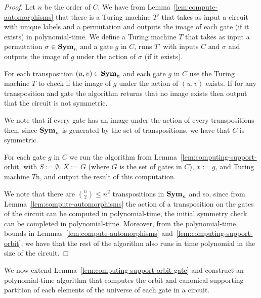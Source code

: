 \documentclass[../paper.tex]{subfiles}
\begin{document}
\begin{proof}
  Let $n$ be the order of $C$. We have from
  Lemma~\ref{lem:compute-automorphisms} that there is a Turing machine $T'$ that
  takes as input a circuit with unique labels and a permutation and outputs the
  image of each gate (if it exists) in polynomial-time. We define a Turing
  machine $T$ that takes as input a permutation $\sigma \in \text{\textbf{Sym}}_n$ and a gate
  $g$ in $C$, runs $T'$ with inputs $C$ and $\sigma$ and outputs the image of
  $g$ under the action of $\sigma$ (if it exists).

  For each transposition $(u,v) \in \text{\textbf{Sym}}_n$ and each gate $g$ in $C$ use the
  Turing machine $T$ to check if the image of $g$ under the action of $(u,v)$
  exists. If for any transposition and gate the algorithm returns that no image
  exists then output that the circuit is not symmetric.

  We note that if every gate has an image under the action of every
  transpositions then, since $\text{\textbf{Sym}}_n$ is generated by the set of transpositions,
  we have that $C$ is symmetric.

  For each gate $g$ in $C$ we run the algorithm from
  Lemma~\ref{lem:computing-support-orbit} with $S := \emptyset$, $X := G$ (where
  $G$ is the set of gates in $C$), $x := g$, and Turing machine $T$n, and output
  the result of this computation.
  
  We note that there are ${{n}\choose{2}} \leq n^2$ transpositions in $\text{\textbf{Sym}}_n$
  and so, since from Lemma~\ref{lem:compute-automorphisms} the action of a
  transposition on the gates of the circuit can be computed in polynomial-time,
  the initial symmetry check can be completed in polynomial-time. Moreover, from
  the polynomial-time bounds in Lemmas~\ref{lem:compute-automorphisms}
  and~\ref{lem:computing-support-orbit}, we have that the rest of the algorithm
  also runs in time polynomial in the size of the circuit.
\end{proof}

We now extend Lemma~\ref{lem:computing-support-orbit-gate} and construct an
polynomial-time algorithm that computes the orbit and canonical supporting
partition of each elements of the universe of each gate in a circuit.
\end{document}
